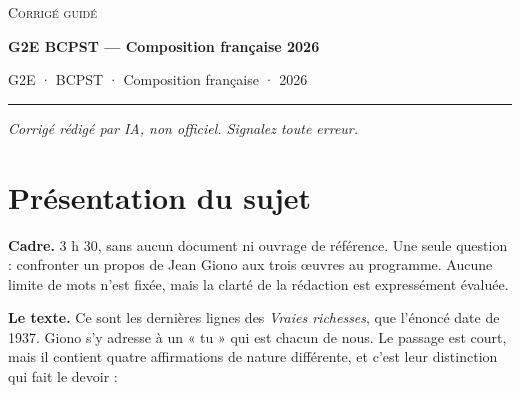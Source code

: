 \documentclass[11pt,a4paper]{article}
\begin{document}
\thispagestyle{plain}
\begin{center}
  {\small\scshape Corrigé guidé}\par\smallskip
  {\LARGE\bfseries G2E BCPST — Composition française 2026\par}\medskip
  {\large G2E · BCPST · Composition française · 2026\par}
\end{center}
\vspace{2pt}\hrule\vspace{8pt}

\emph{Corrigé rédigé par IA, non officiel. Signalez toute erreur.}

\hypertarget{pruxe9sentation-du-sujet}{%
\section{Présentation du sujet}\label{pruxe9sentation-du-sujet}}

\textbf{Cadre.} 3 h 30, sans aucun document ni ouvrage de référence. Une seule question : confronter un propos de Jean Giono aux trois œuvres au programme. Aucune limite de mots n'est fixée, mais la clarté de la rédaction est expressément évaluée.

\textbf{Le texte.} Ce sont les dernières lignes des \emph{Vraies richesses}, que l'énoncé date de 1937. Giono s'y adresse à un « tu » qui est chacun de nous. Le passage est court, mais il contient quatre affirmations de nature différente, et c'est leur distinction qui fait le devoir :
\end{document}
